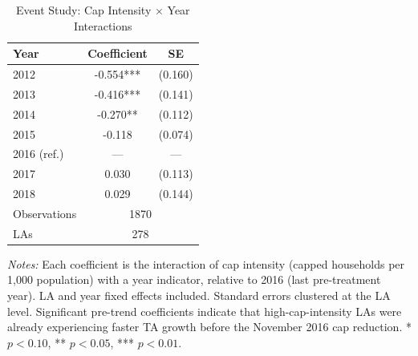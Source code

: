 \begin{table}[t]
\centering
\caption{Event Study: Cap Intensity $\times$ Year Interactions}
\label{tab:event}
\begin{tabular}{lcc}
\toprule
Year & Coefficient & SE \\
\midrule
2012 & -0.554*** & (0.160) \\
2013 & -0.416*** & (0.141) \\
2014 & -0.270** & (0.112) \\
2015 & -0.118 & (0.074) \\
2016 (ref.) & --- & --- \\
\midrule
2017 & 0.030 & (0.113) \\
2018 & 0.029 & (0.144) \\
\midrule
Observations & \multicolumn{2}{c}{1870} \\
LAs & \multicolumn{2}{c}{278} \\
\bottomrule
\end{tabular}
\begin{tablenotes}[flushleft]\footnotesize
\item \textit{Notes:} Each coefficient is the interaction of cap intensity (capped households per 1,000 population) with a year indicator, relative to 2016 (last pre-treatment year). LA and year fixed effects included. Standard errors clustered at the LA level. Significant pre-trend coefficients indicate that high-cap-intensity LAs were already experiencing faster TA growth before the November 2016 cap reduction. * $p < 0.10$, ** $p < 0.05$, *** $p < 0.01$.
\end{tablenotes}
\end{table}
